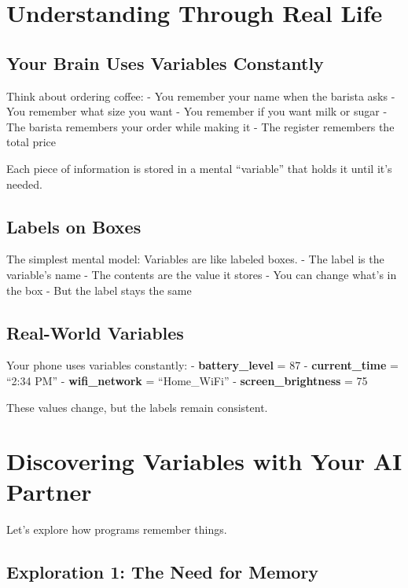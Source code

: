 \documentclass[
  letterpaper,
  DIV=11,
  numbers=noendperiod,
  oneside]{scrreprt}
\begin{document}
\section{Understanding Through Real
Life}\label{understanding-through-real-life-1}

\subsection{Your Brain Uses Variables
Constantly}\label{your-brain-uses-variables-constantly}

Think about ordering coffee: - You remember your name when the barista
asks - You remember what size you want - You remember if you want milk
or sugar - The barista remembers your order while making it - The
register remembers the total price

Each piece of information is stored in a mental ``variable'' that holds
it until it's needed.

\subsection{Labels on Boxes}\label{labels-on-boxes}

The simplest mental model: Variables are like labeled boxes. - The label
is the variable's name - The contents are the value it stores - You can
change what's in the box - But the label stays the same

\subsection{Real-World Variables}\label{real-world-variables}

Your phone uses variables constantly: - \textbf{battery\_level} = 87 -
\textbf{current\_time} = ``2:34 PM'' - \textbf{wifi\_network} =
``Home\_WiFi'' - \textbf{screen\_brightness} = 75

These values change, but the labels remain consistent.

\section{Discovering Variables with Your AI
Partner}\label{discovering-variables-with-your-ai-partner}

Let's explore how programs remember things.

\subsection{Exploration 1: The Need for
Memory}\label{exploration-1-the-need-for-memory}
\end{document}
